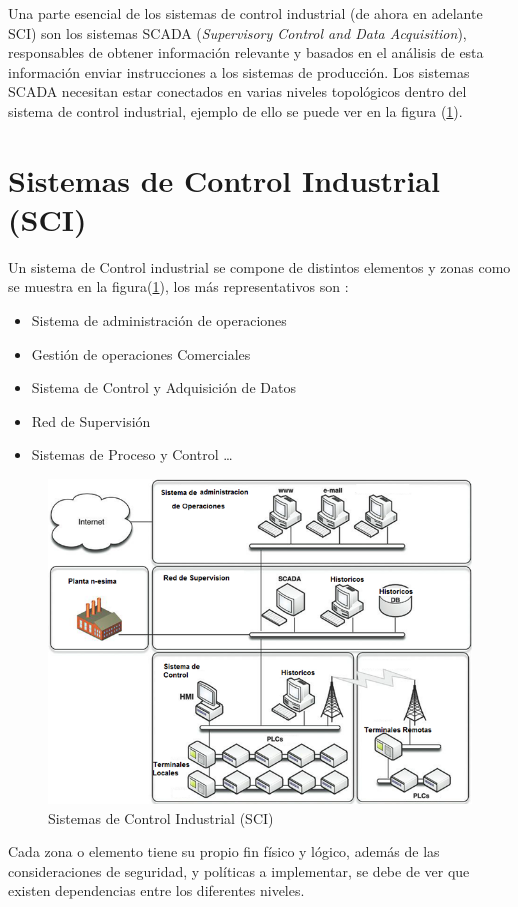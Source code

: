 \documentclass[jou,apacite]{apa6}
\begin{document}
Una parte esencial de los sistemas de control industrial (de ahora en adelante SCI) son los sistemas SCADA (\textit{Supervisory Control and Data Acquisition}), responsables de obtener información relevante y basados en el análisis de esta información enviar instrucciones a los sistemas de producción. Los sistemas SCADA necesitan estar conectados en varias niveles topológicos dentro del sistema de control industrial,  ejemplo de ello se puede ver en la figura (\ref{fig:sci}). 
\section{Sistemas de Control Industrial (SCI)}
Un sistema de Control industrial se compone de distintos elementos y zonas como se muestra en la figura(\ref{fig:sci}),  los más representativos son :
\begin{itemize}
  \item Sistema de administración de  operaciones
  \item Gestión de operaciones Comerciales
  \item Sistema de Control y Adquisición de Datos
  \item Red de Supervisión
  \item Sistemas de Proceso y Control \ldots
\end{itemize}

\begin{figure}[htb]
\centering
\includegraphics[scale=0.5]{images/f2sci.png}
\caption{Sistemas de Control Industrial (SCI)} \label{fig:sci}
\end{figure}
Cada zona o elemento tiene su propio fin físico y lógico, además de las consideraciones de seguridad, y políticas a implementar, se debe de ver que  existen dependencias entre los diferentes niveles. 
\end{document}
